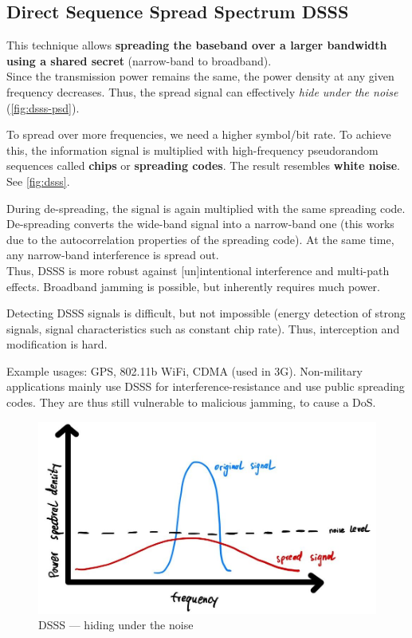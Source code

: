 \subsection{Direct Sequence Spread Spectrum DSSS}
This technique allows  \textbf{spreading the baseband over a larger bandwidth using a shared secret} (narrow-band to broadband). \\
Since the transmission power remains the same, the power density at any given frequency decreases.
Thus, the spread signal can effectively \emph{hide under the noise} (\autoref{fig:dsss-psd}).

To spread over more frequencies, we need a higher symbol/bit rate. To achieve this, the information signal is multiplied with high-frequency pseudorandom sequences called \textbf{chips} or \textbf{spreading codes}.
The result resembles \textbf{white noise}.
See \autoref{fig:dsss}.

During de-spreading, the signal is again multiplied with the same spreading code.
De-spreading converts the wide-band signal into a narrow-band one (this works due to the autocorrelation properties of the spreading code).
At the same time, any narrow-band interference is spread out.
\\
Thus, DSSS is more robust against [un]intentional interference and multi-path effects. Broadband jamming is possible, but inherently requires much power.

Detecting DSSS signals is difficult, but not impossible (energy detection of strong signals, signal characteristics such as constant chip rate). Thus, interception and modification is hard.

Example usages: GPS, 802.11b WiFi, CDMA (used in 3G).
Non-military applications mainly use DSSS for interference-resistance and use public spreading codes.
They are thus still vulnerable to malicious jamming, to cause a DoS.

\begin{figure}[h]
	\centering
	\includegraphics[scale=0.4]{images/2-dsss-psd.jpg}
	\caption{DSSS --- hiding under the noise}%
	\label{fig:dsss-psd}
\end{figure}

